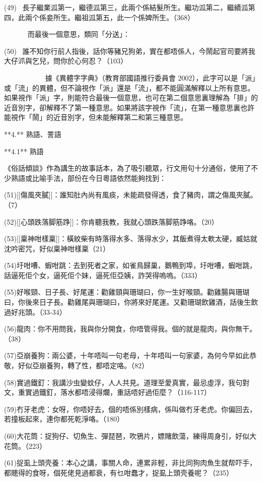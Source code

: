 (49)  長子繼業泒第一，繼德泒第三，此兩个係結髮所生。繼功泒第二，繼績泒第四，此兩个係妾所生。繼祖泒第五，此一个係婢所生。（368）

       而最後一個意思，類同「分送」：

(50)  誰不知你行前人指後，話你等豬兄狗弟，實在都唔係人，今鬧起官司要將我大仔沠與乞兒，問你於心何忍？（103）

            據《異體字字典》（教育部國語推行委員會 2002），此字可以是「派」或「流」的異體，但不論視作「派」還是「流」，都不能圓滿解釋以上所有意思。如果視作「派」字，則能符合最後一個意思，也可在第二個意思裏理解為「排」的近音別字，卻解釋不了第一種意思。如果將該字視作「流」，在第一種意思裏也許能視作「鬧」的近音別字，但未能解釋第二和第三種意思。

**4.** 熟語、詈語

**4.1** 熟語

《俗話傾談》作為講生的故事話本，為了吸引聽眾，行文用句十分通俗，使用了不少熟語或比喻手法，部份在今日粵語依然能夠找到：

(51)[[傷風夾膩]]：誰知肚內尚有風痰，未能疏發得透，食了豬肉，謂之傷風夾膩。（7）

(52)[[心頭跌落脚筋踭]]：你肯聽我教，我就心頭跌落脚筋踭咯。（20）

(53)[[稟神咁樣稟]]：橫紋柴有時落得水多、落得水少，其飯煮得太軟太硬，臧姑就沈吟密咒，好似稟神咁樣稟（21）

(54)圩咁嘈、蝦咁跳：去到死者之家，如雀鳥歸巢，鵝鴨到埠，圩咁嘈，蝦咁跳，話逼死佢个女，逼死佢个妹，逼死佢亞姨，詐哭得嗚嗚。（333）

(55)好喉頸、日子長、好尾運：勸雞頸與珊瑚曰，你一生好喉頸。勸雞腸與珊瑚曰，你後來日子長。勸雞尾與珊瑚曰，你將來好尾運。又勸珊瑚飲雞酒，話後生飲過好兆頭。（33-34）

(56)龍肉：你不用問我，我與你分開食，你唔管得我。個的就是龍肉，與你無干。（38）

(57)亞崩養狗：兩公婆，十年唔叫一句老母，十年唔叫一句家婆，為何今早如此恭敬，好似亞崩養狗，轉了性，都唔定咯。（82）

(58)實過鐵釘：我講沙虫變蚊仔，人人共見。道理至愛真實，最忌虛浮，我句對文，重實過鐵釘，落水都唔浸得爛，重話唔好過佢麼？（116-117）

(59)冇牙老虎：女呀，你唔好去，個的唔係別樣病，係叫做冇牙老虎。你偏回去，若撞板起來，連你都死乾淨咯。（180）

(60)大花筒：捉狗仔、切魚生、彈琵琶，吹鴉片，嫖賭飲蕩，練得周身引，好似大花筒。（223）

(61)捉虱上頭壳養：本心之講，事關人命，連累非輕，非比同狗肉魚生就帮吓手，都贃得的食呀，個死佬見過都衰，有乜咁蠢才，捉虱上頭壳養呢？（235）

